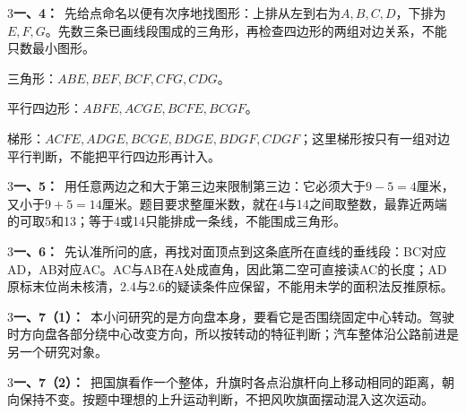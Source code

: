 \documentclass[multi=snippet,border={5bp 20bp 5bp 5bp}]{standalone}
\newenvironment{snippet}[3]{\begin{minipage}{#1bp}\color{answerred}\fontsize{#2}{#3}\selectfont\raggedright}{\end{minipage}}
\begin{document}
\begin{snippet}{505}{11.5}{14}\begin{multicols}{3}\raggedcolumns \textbf{一、4：}\ 先给点命名以便有次序地找图形：上排从左到右为\(A,\allowbreak B,\allowbreak C,\allowbreak D\)\allowbreak ，下排为\(E,\allowbreak F,\allowbreak G\)\allowbreak 。先数三条已画线段围成的三角形，再检查四边形的两组对边关系，不能只数最小图形。\par 三角形：\(ABE,\allowbreak BEF,\allowbreak BCF,\allowbreak CFG,\allowbreak CDG\)\allowbreak 。\par 平行四边形：\(ABFE,\allowbreak ACGE,\allowbreak BCFE,\allowbreak BCGF\)\allowbreak 。\par 梯形：\(ACFE,\allowbreak ADGE,\allowbreak BCGE,\allowbreak BDGE,\allowbreak BDGF,\allowbreak CDGF\)\allowbreak ；这里梯形按只有一组对边平行判断，不能把平行四边形再计入。\end{multicols}\end{snippet}
\begin{snippet}{505}{11.5}{14}\begin{multicols}{3}\raggedcolumns \textbf{一、5：}\ 用任意两边之和大于第三边来限制第三边：它必须大于\(9-5=4\)\allowbreak 厘米，又小于\(9+5=14\)\allowbreak 厘米。题目要求整厘米数，就在4与14之间取整数，最靠近两端的可取5和13；等于4或14只能排成一条线，不能围成三角形。\end{multicols}\end{snippet}
\begin{snippet}{505}{11.5}{14}\begin{multicols}{3}\raggedcolumns \textbf{一、6：}\ 先认准所问的底，再找对面顶点到这条底所在直线的垂线段：BC对应AD，AB对应AC。AC与AB在A处成直角，因此第二空可直接读AC的长度；AD原标末位尚未核清，2.4与2.6的疑读条件应保留，不能用未学的面积法反推原标。\end{multicols}\end{snippet}
\begin{snippet}{505}{11.5}{14}\begin{multicols}{3}\raggedcolumns \textbf{一、7（1）：}\ 本小问研究的是方向盘本身，要看它是否围绕固定中心转动。驾驶时方向盘各部分绕中心改变方向，所以按转动的特征判断；汽车整体沿公路前进是另一个研究对象。\end{multicols}\end{snippet}
\begin{snippet}{505}{11.5}{14}\begin{multicols}{3}\raggedcolumns \textbf{一、7（2）：}\ 把国旗看作一个整体，升旗时各点沿旗杆向上移动相同的距离，朝向保持不变。按题中理想的上升运动判断，不把风吹旗面摆动混入这次运动。\end{multicols}\end{snippet}
\end{document}
